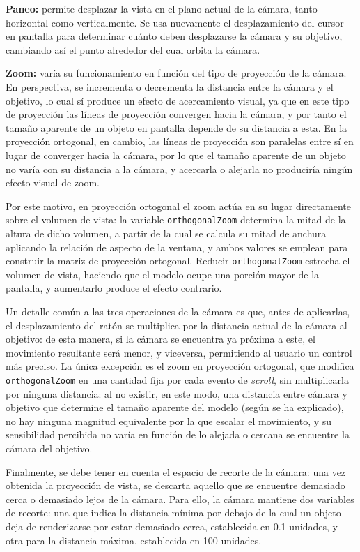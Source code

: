 \textbf{Paneo:} permite desplazar la vista en el plano actual de la cámara, tanto horizontal como verticalmente. Se usa nuevamente el desplazamiento del cursor en pantalla para determinar cuánto deben desplazarse la cámara y su objetivo, cambiando así el punto alrededor del cual orbita la cámara.

\textbf{Zoom:} varía su funcionamiento en función del tipo de proyección de la cámara. En perspectiva, se incrementa o decrementa la distancia entre la cámara y el objetivo, lo cual sí produce un efecto de acercamiento visual, ya que en este tipo de proyección las líneas de proyección convergen hacia la cámara, y por tanto el tamaño aparente de un objeto en pantalla depende de su distancia a esta. En la proyección ortogonal, en cambio, las líneas de proyección son paralelas entre sí en lugar de converger hacia la cámara, por lo que el tamaño aparente de un objeto no varía con su distancia a la cámara, y acercarla o alejarla no produciría ningún efecto visual de zoom.

Por este motivo, en proyección ortogonal el zoom actúa en su lugar directamente sobre el volumen de vista: la variable \texttt{orthogonalZoom} determina la mitad de la altura de dicho volumen, a partir de la cual se calcula su mitad de anchura aplicando la relación de aspecto de la ventana, y ambos valores se emplean para construir la matriz de proyección ortogonal. Reducir \texttt{orthogonalZoom} estrecha el volumen de vista, haciendo que el modelo ocupe una porción mayor de la pantalla, y aumentarlo produce el efecto contrario.

Un detalle común a las tres operaciones de la cámara es que, antes de aplicarlas, el desplazamiento del ratón se multiplica por la distancia actual de la cámara al objetivo: de esta manera, si la cámara se encuentra ya próxima a este, el movimiento resultante será menor, y viceversa, permitiendo al usuario un control más preciso. La única excepción es el zoom en proyección ortogonal, que modifica \texttt{orthogonalZoom} en una cantidad fija por cada evento de \emph{scroll}, sin multiplicarla por ninguna distancia: al no existir, en este modo, una distancia entre cámara y objetivo que determine el tamaño aparente del modelo (según se ha explicado), no hay ninguna magnitud equivalente por la que escalar el movimiento, y su sensibilidad percibida no varía en función de lo alejada o cercana se encuentre la cámara del objetivo.

Finalmente, se debe tener en cuenta el espacio de recorte de la cámara: una vez obtenida la proyección de vista, se descarta aquello que se encuentre demasiado cerca o demasiado lejos de la cámara. Para ello, la cámara mantiene dos variables de recorte: una que indica la distancia mínima por debajo de la cual un objeto deja de renderizarse por estar demasiado cerca, establecida en 0.1 unidades, y otra para la distancia máxima, establecida en 100 unidades.

